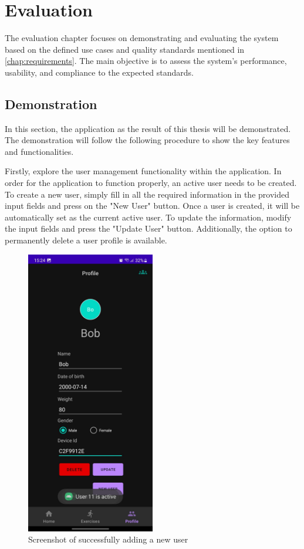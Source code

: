 \chapter{Evaluation}

The evaluation chapter focuses on demonstrating and evaluating the system based on the defined use cases and quality standards mentioned in \autoref{chap:requirements}. 
The main objective is to assess the system's performance, usability, and compliance to the expected standards. 

\section{Demonstration}
In this section, the application as the result of this thesis will be demonstrated. The demonstration will follow the following procedure to show the key features and functionalities.

Firstly, explore the user management functionality within the application. 
In order for the application to function properly, an active user needs to be created.
To create a new user, simply fill in all the required information in the provided input fields and press on the "New User" button.
Once a user is created, it will be automatically set as the current active user.
To update the information, modify the input fields and press the "Update User" button.
Additionally, the option to permanently delete a user profile is available.
\begin{figure}[H]
    \centering
    \includegraphics[width=0.5\textwidth]{images/add-new-user.jpeg}
    \caption{Screenshot of successfully adding a new user}
    \label{fig:add-new-user-screenshot}
\end{figure}


